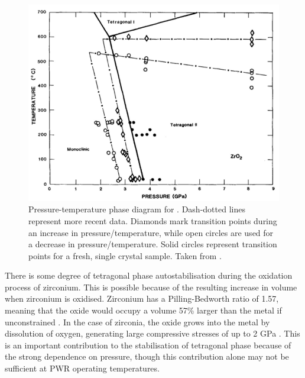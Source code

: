 \begin{figure}[htp]
  \centering
      \includegraphics[width=13cm]{images/zirconiaphasediagram.png}
  \caption[Pressure-temperature phase diagram for \zirconia . Dash-dotted lines represent more recent data. Diamonds mark transition points during an increase in pressure/temperature, while open circles are used for a decrease in pressure/temperature. Solid circles represent transition points for a fresh, single crystal sample.]{Pressure-temperature phase diagram for \zirconia . Dash-dotted lines represent more recent data. Diamonds mark transition points during an increase in pressure/temperature, while open circles are used for a decrease in pressure/temperature. Solid circles represent transition points for a fresh, single crystal sample. Taken from \cite{block1985pressure}. \label{fig:phasediagram}}
\end{figure}

There is some degree of tetragonal phase autostabilisation during the oxidation process of zirconium. This is possible because of the resulting increase in volume when zirconium is oxidised. Zirconium has a Pilling-Bedworth ratio of 1.57, meaning that the oxide would occupy a volume 57\% larger than the metal if unconstrained \cite{cramer2003corrosion, Pilling1923}. In the case of zirconia, the oxide grows into the metal by dissolution of oxygen, generating large compressive stresses of up to 2 GPa \cite{Petigny2000, garzarolli1991oxide}. This is an important contribution to the stabilisation of tetragonal phase because of the strong dependence on pressure, though this contribution alone may not be sufficient at PWR operating temperatures.


